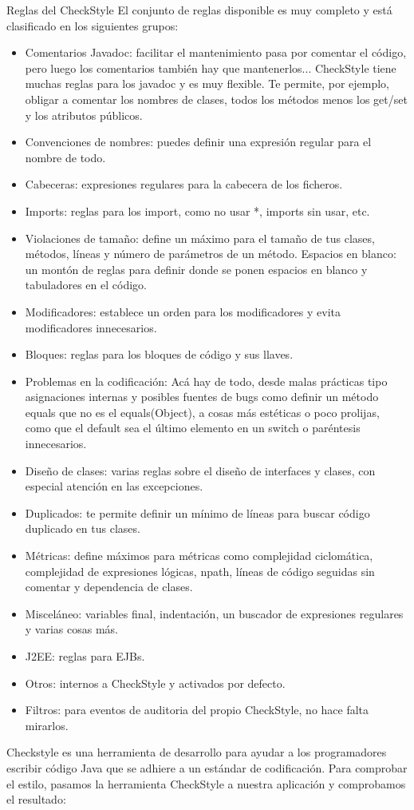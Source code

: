 \documentclass[12pt, a4paper, titlepage]{article}
\begin{document}
		Reglas del CheckStyle
		El conjunto de reglas disponible es muy completo y está clasificado en los siguientes grupos:
	\begin{itemize}
		\item Comentarios Javadoc: facilitar el mantenimiento pasa por comentar el código, pero luego los comentarios también hay que mantenerlos... CheckStyle tiene muchas reglas para los javadoc y es muy flexible. Te permite, por ejemplo, obligar a comentar los nombres de clases, todos los métodos menos los get/set y los atributos públicos.
		\item Convenciones de nombres: puedes definir una expresión regular para el nombre de todo. 
		\item 	Cabeceras: expresiones regulares para la cabecera de los ficheros.
		\item Imports: reglas para los import, como no usar *, imports sin usar, etc.
		\item Violaciones de tamaño: define un máximo para el tamaño de tus clases, métodos, líneas y número de parámetros de un método.
		Espacios en blanco: un montón de reglas para definir donde se ponen espacios en blanco y tabuladores en el código.
		\item Modificadores: establece un orden para los modificadores y evita modificadores innecesarios.
		\item Bloques: reglas para los bloques de código y sus llaves.
		\item Problemas en la codificación: Acá hay de todo, desde malas prácticas tipo asignaciones internas y posibles fuentes de bugs como definir un método equals que no es el equals(Object), a cosas más estéticas o poco prolijas, como que el default sea el último elemento en un switch o paréntesis innecesarios.
		\item Diseño de clases: varias reglas sobre el diseño de interfaces y clases, con especial atención en las excepciones.
		\item Duplicados: te permite definir un mínimo de líneas para buscar código duplicado en tus clases.
		\item Métricas: define máximos para métricas como complejidad ciclomática, complejidad de expresiones lógicas, npath, líneas de código seguidas sin comentar y dependencia de clases.
		\item Misceláneo: variables final, indentación, un buscador de expresiones regulares y varias cosas más.
		\item J2EE: reglas para EJBs.
		\item Otros: internos a CheckStyle y activados por defecto.
		\item Filtros: para eventos de auditoria del propio CheckStyle, no hace falta mirarlos.
	\end{itemize}	
		Checkstyle es una herramienta de desarrollo para ayudar a los programadores escribir código Java que se adhiere a un estándar de codificación. 
		Para comprobar el estilo, pasamos la herramienta CheckStyle a nuestra aplicación y comprobamos el resultado:
\end{document}

